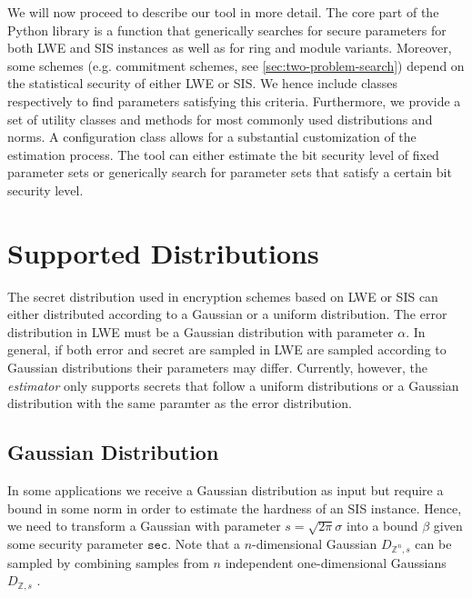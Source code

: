 We will now proceed to describe our tool in more detail. The core part of the Python library is a function that generically searches for secure parameters for both LWE and SIS instances as well as for ring and module variants. Moreover, some schemes (e.g. commitment schemes, see \cref{sec:two-problem-search}) depend on the statistical security of either LWE or SIS. We hence include classes respectively to find parameters satisfying this criteria. %
Furthermore, we provide a set of utility classes and methods for most commonly used distributions and norms.
A configuration class allows for a substantial customization of the estimation process.
The tool can either estimate the bit security level of fixed parameter sets or generically search for parameter sets that satisfy a certain bit security level.

\section{Supported Distributions} \label{sec:supported-distributions}%
The secret distribution used in encryption schemes based on LWE or SIS can either distributed according to a Gaussian or a uniform distribution. The error distribution in LWE must be a Gaussian distribution with parameter $\alpha$. In general, if both error and secret are sampled in LWE are sampled according to Gaussian distributions their parameters may differ. Currently, however, the \textit{estimator} only supports secrets that follow a uniform distributions or a Gaussian distribution with the same paramter as the error distribution.

\subsection{Gaussian Distribution}
In some applications we receive a Gaussian distribution as input but require a bound in some norm in order to estimate the hardness of an SIS instance. Hence, we need to transform a Gaussian with parameter $s  = \sqrt{2 \pi} \sigma$ into a bound $\beta$ given some security parameter $\texttt{sec}$. Note that a $n$-dimensional Gaussian $D_{\mathbb{Z}^n, s}$ can be sampled by combining samples from $n$ independent one-dimensional Gaussians $D_{\mathbb{Z}, s}$ \cite{GJS15}. %


